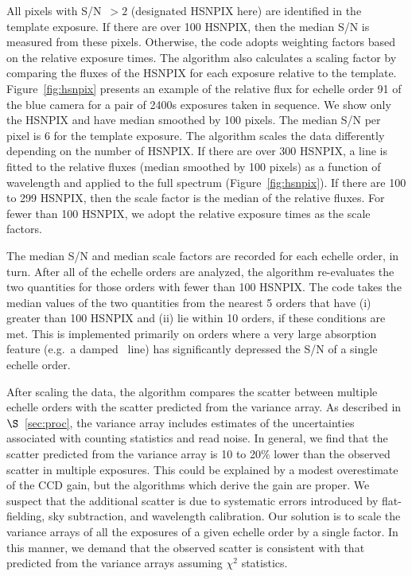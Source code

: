 \documentclass[12pt,preprint]{aastex}
\begin{document}
All pixels with S/N~$>2$ (designated HSNPIX here) are identified
in the template exposure.  If there are over 100 HSNPIX, then
the median S/N is measured from these pixels.  Otherwise, the
code adopts weighting factors based on the relative exposure times.
The algorithm also calculates a scaling factor by comparing the
fluxes of the HSNPIX for each exposure relative to the template.
Figure~\ref{fig:hsnpix} presents an example of the relative flux
for echelle order 91 of the blue camera for a pair of 2400s exposures
taken in sequence.  We show only the HSNPIX and have median smoothed
by 100 pixels.  The median S/N per pixel is 6 for the template
exposure.   The algorithm scales the data differently depending
on the number of HSNPIX.
If there are over 300 HSNPIX, a line is fitted to the relative
fluxes (median smoothed by 100 pixels)
as a function of wavelength and applied to the full spectrum  
(Figure~\ref{fig:hsnpix}).
If there are 100 to 299 HSNPIX, then the scale factor is the median of 
the relative fluxes.  For fewer than 100 HSNPIX, we adopt the relative
exposure times as the scale factors.

The median S/N and median scale factors are recorded for each
echelle order, in turn.  After all of the echelle orders are
analyzed, the algorithm re-evaluates the two quantities for those
orders with fewer than 100 HSNPIX.  The code takes the median values
of the two quantities from the nearest 5 orders that have (i)
greater than 100 HSNPIX and (ii) lie within 10 orders, if these
conditions are met.  This is implemented primarily on
orders where a very large absorption feature (e.g.\ a damped \lya\ line)
has significantly depressed the S/N of a single echelle order.

After scaling the data, the algorithm compares the scatter
between multiple echelle orders with the scatter predicted from
the variance array.  As described in $\S$~\ref{sec:proc},
the variance array includes
estimates of the uncertainties associated with counting statistics and read noise.
In general, we find that the scatter predicted from the variance array is 
10 to 20$\%$ lower than the observed scatter in multiple exposures.
This could be explained by a modest overestimate of the CCD gain,
but the algorithms which derive the gain are proper.
We suspect that the additional scatter
is due to systematic errors introduced by flat-fielding, 
sky subtraction, and wavelength calibration.  Our solution is to
scale the variance arrays of all the exposures of a given echelle order
by a single factor.  In this manner,  we demand that the 
observed scatter is consistent
with that predicted from the variance arrays assuming $\chi^2$
statistics. 
\end{document}
